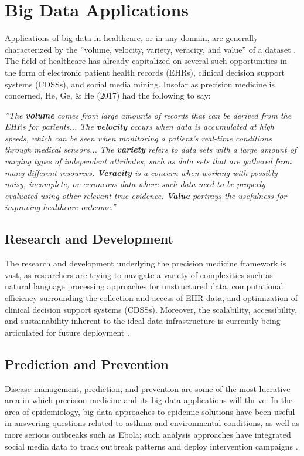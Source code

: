 \section{Big Data Applications}

Applications of big data in healthcare, or in any domain, are generally characterized by the ''volume, velocity, variety, 
veracity, and value'' of a dataset \cite{Jagadish2014}. The field of healthcare has already capitalized on several such 
opportunities in the form of electronic patient health records (EHRs), clinical decision support systems (CDSSs), and 
social media mining. Insofar as precision medicine is concerned, He, Ge, \& He (2017) had the following to say:

\textit{''The \textbf{volume} comes from large amounts of records that can be derived from the EHRs for patients... The 
\textbf{velocity} occurs when data is accumulated at high speeds, which can be seen when monitoring a patient’s real-time 
conditions through medical sensors... The \textbf{variety} refers to data sets with a large amount of varying types of 
independent attributes, such as data sets that are gathered from many different resources. \textbf{Veracity} is a concern 
when working with possibly noisy, incomplete, or erroneous data where such data need to be properly evaluated using other 
relevant true evidence. \textbf{Value} portrays the usefulness for improving healthcare outcome.''} \cite{He2017}

\subsection{Research and Development}

The research and development underlying the precision medicine framework is vast, as researchers are trying to navigate a 
variety of complexities such as natural language processing approaches for unstructured data, computational efficiency 
surrounding the collection and access of EHR data, and optimization of clinical decision support systems (CDSSs). Moreover, 
the scalability, accessibility, and sustainability inherent to the ideal data infrastructure is currently being articulated 
for future deployment \cite{He2017}.

\subsection{Prediction and Prevention}

Disease management, prediction, and prevention are some of the most lucrative area in which precision medicine and its big 
data applications will thrive. In the area of epidemiology, big data approaches to epidemic solutions have been useful in 
answering questions related to asthma and environmental conditions, as well as more serious outbreaks such as Ebola; such 
analysis approaches have integrated social media data to track outbreak patterns and deploy intervention campaigns 
\cite{Leff2015}.

